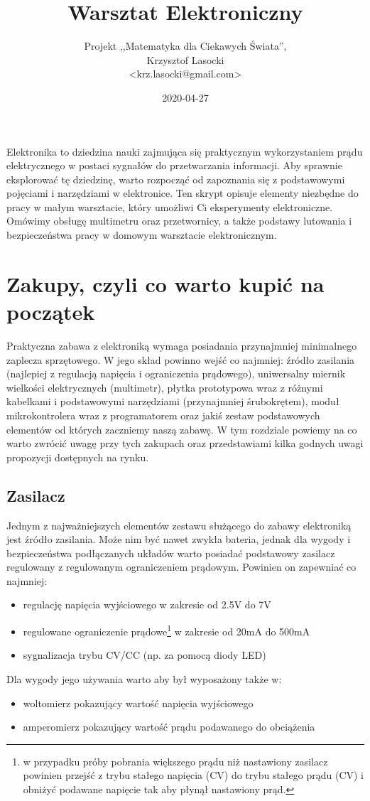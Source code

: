 \documentclass{pdfBooklets}
\title{Warsztat Elektroniczny}
\author{%
	Projekt ,,Matematyka dla Ciekawych Świata'',\\
	Krzysztof Lasocki\\\normalsize\ttfamily <krz.lasocki@gmail.com>
}
\date  {2020-04-27}
\begin{document}
\maketitle

Elektronika to dziedzina nauki zajmująca się praktycznym wykorzystaniem prądu elektrycznego w postaci sygnałów do przetwarzania
informacji. Aby sprawnie eksplorować tę dziedzinę, warto rozpocząć od zapoznania się z podstawowymi pojęciami i narzędziami w
elektronice. Ten skrypt opisuje elementy niezbędne do pracy w małym warsztacie, który umożliwi Ci eksperymenty elektroniczne.
Omówimy obsługę multimetru oraz przetwornicy, a także podstawy lutowania i bezpieczeństwa pracy w domowym warsztacie elektronicznym.

\section{Zakupy, czyli co warto kupić na początek}

Praktyczna zabawa z elektroniką wymaga posiadania przynajmniej minimalnego zaplecza sprzętowego.
W jego skład powinno wejść co najmniej:
	źródło zasilania (najlepiej z regulacją napięcia i ograniczenia prądowego),
	uniwersalny miernik wielkości elektrycznych (multimetr),
	płytka prototypowa wraz z różnymi kabelkami i podstawowymi narzędziami (przynajmniej śrubokrętem),
	moduł mikrokontrolera wraz z programatorem
	oraz jakiś zestaw podstawowych elementów od których zaczniemy naszą zabawę.
W tym rozdziale powiemy na co warto zwrócić uwagę przy tych zakupach oraz przedstawiami kilka godnych uwagi propozycji dostępnych na rynku.

\subsection{Zasilacz}
	Jednym z najważniejszych elementów zestawu służącego do zabawy elektroniką jest źródło zasilania.
	Może nim być nawet zwykła bateria, jednak dla wygody i bezpieczeństwa podłączanych układów warto posiadać podstawowy zasilacz regulowany z regulowanym ograniczeniem prądowym.
	Powinien on zapewniać co najmniej:
	\begin{itemize}
		\item regulację napięcia wyjściowego w zakresie od 2.5V do 7V
		\item regulowane ograniczenie prądowe\footnote{
			w przypadku próby pobrania większego prądu niż nastawiony zasilacz powinien
			przejść z trybu stałego napięcia (CV) do trybu stałego prądu (CV)
			i obniżyć podawane napięcie tak aby płynął nastawiony prąd.
		} w zakresie od 20mA do 500mA
		\item sygnalizacja trybu CV/CC (np. za pomocą diody LED)
	\end{itemize}
	Dla wygody jego używania warto aby był wyposażony także w:
	\begin{itemize}
		\item woltomierz pokazujący wartość napięcia wyjściowego
		\item amperomierz pokazujący wartość prądu podawanego do obciążenia
	\end{itemize}
	
\end{document}
